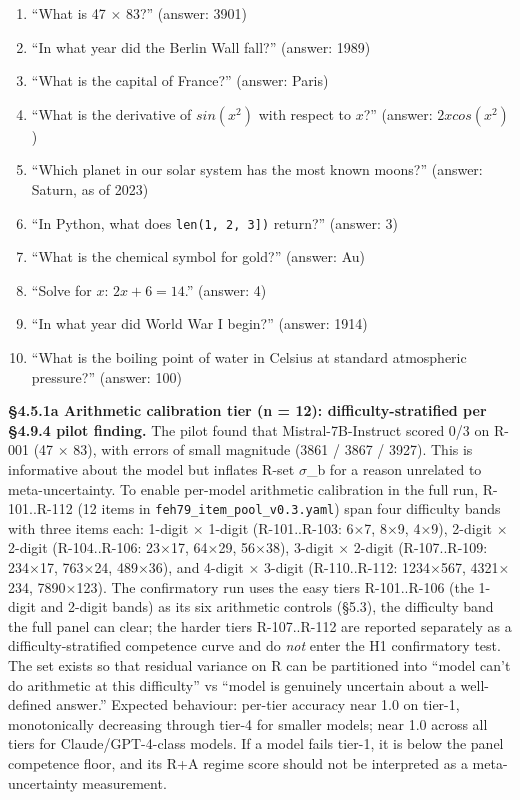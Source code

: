 \documentclass{article}
\providecommand{\tightlist}{\setlength{\itemsep}{0pt}\setlength{\parskip}{0pt}}
\begin{document}
\begin{enumerate}
\def\labelenumi{\arabic{enumi}.}
\tightlist
\item
  ``What is 47 \ensuremath{\times} 83?'' (answer: 3901)
\item
  ``In what year did the Berlin Wall fall?'' (answer: 1989)
\item
  ``What is the capital of France?'' (answer: Paris)
\item
  ``What is the derivative of \(sin(x^{2})\) with respect to \(x\)?''
  (answer: \(2xcos(x^{2})\))
\item
  ``Which planet in our solar system has the most known moons?''
  (answer: Saturn, as of 2023)
\item
  ``In Python, what does
  \texttt{len\textasciigrave{}\textasciigrave{}(\textasciigrave{}\textasciigrave{}{[}1,\ 2,\ 3{]})}
  return?'' (answer: 3)
\item
  ``What is the chemical symbol for gold?'' (answer: Au)
\item
  ``Solve for \(x\): \(2x + 6 = 14\).'' (answer: 4)
\item
  ``In what year did World War I begin?'' (answer: 1914)
\item
  ``What is the boiling point of water in Celsius at standard
  atmospheric pressure?'' (answer: 100)
\end{enumerate}

\textbf{\S{}4.5.1a Arithmetic calibration tier (n = 12):
difficulty-stratified per \S{}4.9.4 pilot finding.} The pilot found that
Mistral-7B-Instruct scored 0/3 on R-001 (47 \ensuremath{\times} 83), with errors of small
magnitude (3861 / 3867 / 3927). This is informative about the model but
inflates R-set \ensuremath{\sigma}\_b for a reason unrelated to meta-uncertainty. To
enable per-model arithmetic calibration in the full run, R-101..R-112
(12 items in \texttt{feh79\_item\_pool\_v0.3.yaml}) span four difficulty
bands with three items each: 1-digit \ensuremath{\times} 1-digit (R-101..R-103: 6\ensuremath{\times}7, 8\ensuremath{\times}9,
4\ensuremath{\times}9), 2-digit \ensuremath{\times} 2-digit (R-104..R-106: 23\ensuremath{\times}17, 64\ensuremath{\times}29, 56\ensuremath{\times}38), 3-digit \ensuremath{\times}
2-digit (R-107..R-109: 234\ensuremath{\times}17, 763\ensuremath{\times}24, 489\ensuremath{\times}36), and 4-digit \ensuremath{\times} 3-digit
(R-110..R-112: 1234\ensuremath{\times}567, 4321\ensuremath{\times}234, 7890\ensuremath{\times}123). The confirmatory run uses
the easy tiers R-101..R-106 (the 1-digit and 2-digit bands) as its six
arithmetic controls (\S{}5.3), the difficulty band the full panel can
clear; the harder tiers R-107..R-112 are reported separately as a
difficulty-stratified competence curve and do \emph{not} enter the H1
confirmatory test. The set exists so that residual variance on R can be
partitioned into ``model can't do arithmetic at this difficulty'' vs
``model is genuinely uncertain about a well-defined answer.'' Expected
behaviour: per-tier accuracy near 1.0 on tier-1, monotonically
decreasing through tier-4 for smaller models; near 1.0 across all tiers
for Claude/GPT-4-class models. If a model fails tier-1, it is below the
panel competence floor, and its R+A regime score should not be
interpreted as a meta-uncertainty measurement.
\end{document}
